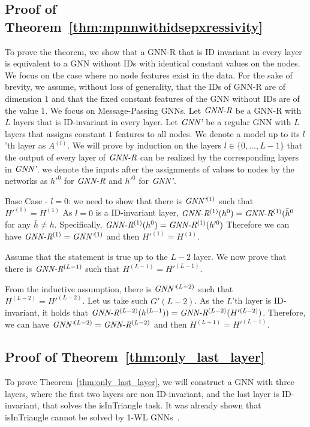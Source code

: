 \subsection{Proof of Theorem~\ref{thm:mpnnwithidsepxressivity}}
To prove the theorem, we show that a GNN-R that is ID invariant in every layer is equivalent to a GNN without IDs with identical constant values on the nodes. We focus on the case where no node features exist in the data. For the sake of brevity, we assume, without loss of generality, that the IDs of GNN-R are of dimension $1$ and that the fixed constant features of the GNN without IDs are of the value $1$. We focus on Message-Passing GNNs.
Let $\textit{GNN-R}{}$ be a GNN-R with $L$ layers that is ID-invariant in every layer. Let $\textit{GNN'}{}$ be a regular GNN with $L$ layers that assigns constant $1$ features to all nodes. 
We denote a model up to its $l$'th layer as $A^{(l)}$.
We will prove by induction on the layers $l\in \{0,...,L-1\}$ that the output of every layer of $\textit{GNN-R}{}$ can be realized by the corresponding layers in $\textit{GNN'}{}$.
we denote the inputs after the assignments of values to nodes by the networks as $h'^{0}$ for $\textit{GNN-R}{}$ and  $h'^{0}$ for $\textit{GNN'}{}$.

Base Case - $l=0$: we need to show that there is $\textit{GNN'}{}^{(1)}$ such that $H'^{(1)} =  H^{(1)}$
As $l=0$ is a  ID-invariant layer, 
$\textit{GNN-R}{}^{(1)}(h^{0}) = \textit{GNN-R}{}^{(1)}(\bar{h}^{0}$ for any $\bar{h} \neq h$.
Specifically, $\textit{GNN-R}{}^{(1)}(h^{0}) = \textit{GNN-R}{}^{(1)}(h'^{0})$
Therefore we can have $\textit{GNN-R}{}^{(1)} = \textit{GNN'}{}^{(1)}$ and then $H'^{(1)} =  H^{(1)}$.

Assume that the statement is true up to the $L-2$ layer.
We now prove that there is $\textit{GNN-R}{}^{(L-1)}$ such that $H^{(L-1)} = H'^{(L-1)}$.

From the inductive assumption, there is $\textit{GNN'}{}^{(L-2)}$ such that $H^{(L-2)} = H'^{(L-2)}$. Let  us take such $G'{(L-2)}$. As the $L$'th layer is ID-invariant, it holds that $\textit{GNN-R}{}^{(L-2)}(h^{(L-1})) = \textit{GNN-R}{}^{(L-2)}(H'^{(L-2)})$. Therefore, we can have $\textit{GNN'}{}^{(L-2)} = \textit{GNN-R}{}^{(L-2)}$ and then $H^{(L-1)} = H'^{(L-1)}$.


\subsection{Proof of Theorem~\ref{thm:only_last_layer}}
To prove Theorem~\ref{thm:only_last_layer}, we will construct a GNN with three layers, where the first two layers are non ID-invariant, and the last layer is ID-invariant, that solves the isInTriangle task. It was already shown that isInTriangle cannot be solved by 1-WL GNNs~\citep{cyclesgnns}.

